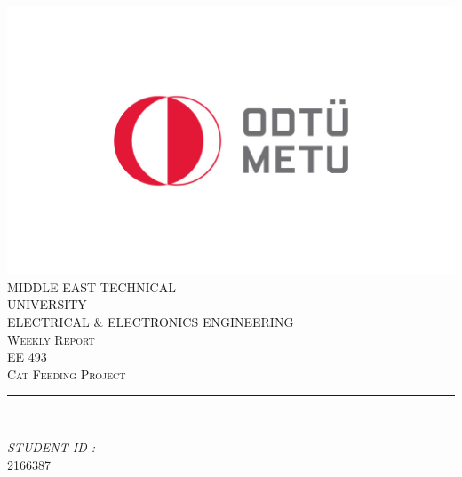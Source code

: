 \documentclass[12pt]{article}
\makeatletter
\let\thetitle\@title
\makeatother
\begin{document}

\begin{titlepage}
	\centering
    \vspace*{0.5 cm}
    \includegraphics[scale = 1.5]{METU_Logo.jpg}\\[1.0 cm]	%
    \textsc{\Large MIDDLE EAST TECHNICAL} \\[0.2 cm]
    \textsc{\Large UNIVERSITY} \\ [2.0 cm]
    \textsc{\large ELECTRICAL \& ELECTRONICS ENGINEERING} \\[0.2 cm]
    \textsc{\large Weekly Report \weekNum}\\[0.2 cm]
	\textsc{\large EE 493}\\[0.5 cm]				%
	\textsc{\large Cat Feeding Project}\\[0.2 cm]
	\rule{\linewidth}{0.2 mm} \\[0.4 cm]
	{ \huge \bfseries \thetitle}
	
	\begin{minipage}{0.4\textwidth}
		
			\begin{flushright} 
			\emph{STUDENT ID :} \\
			2166387\linebreak
			
		\end{flushright}
	\end{minipage}\\[2 cm]
	

 
	\vfill
	
\end{titlepage}
\end{document}
